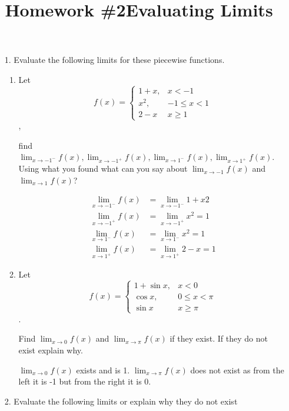 \documentclass[12pt,reqno]{article}
\title{Homework \#2}
\theoremstyle{definition}
\begin{document}
	\title{Evaluating Limits}
	\date{ }
	\maketitle
	
	\begin{enumerate}
		\item[1.] Evaluate the following limits for these piecewise functions.
		
		\begin{enumerate}
			
			\item  Let \[f(x)=\begin{cases} 1+x, & x<-1 \\ x^2, & -1\leq x<1 \\ 2-x & x\geq 1 \end{cases} \],
			
			find $\lim_{x \to -1^{-}} f(x), \lim_{x \to -1^+} f(x), \lim_{x \to 1^{-}} f(x), \lim_{x \to 1^+} f(x)$. Using what you found what can you say about $\lim_{x\to -1} f(x)$ and $\lim_{x\to 1} f(x)$? 
			
			\begin{align*}	
			\lim_{x \to -1^{-}} f(x) &= \lim_{x \to - 1^{-}} 1 + x 2 \\
			\lim_{x \to - 1^+} f(x) &= \lim_{x \to -1^+} x^2 = 1  \\
			\lim_{x \to 1^-} f(x) &= \lim_{x \to 1^-} x^2  =  1  \\ 
			\lim_{x \to 1^+} f(x) &= \lim_{x \to 1^+} 2 -x  = 1
			\end{align*}
			
			\item Let \[f(x)=\begin{cases} 1+\sin x, & x<0 \\ \cos x, & 0\leq x<\pi \\ \sin x & x\geq \pi \end{cases} \].
			
			Find $\lim_{x \to 0} f(x)$ and $\lim_{x \to \pi} f(x)$ if they exist. If they do not exist explain why. 
			
			$\lim_{x \to 0} f(x)$ exists and is 1. $\lim_{x\to \pi} f(x)$ does not exist as from the left it is -1 but from the right it is 0. 
			
			
		\end{enumerate}
		
	  \item[2.] Evaluate the following limits or explain why they do not exist
		

\end{enumerate}
\end{document}
